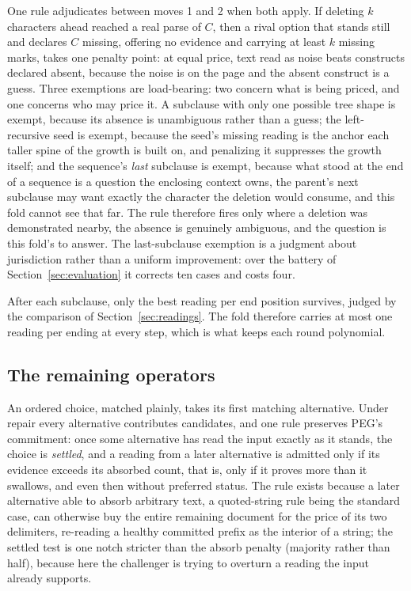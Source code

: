 \documentclass[manuscript]{acmart}
\begin{document}
One rule adjudicates between moves 1 and 2 when both apply. If deleting $k$ characters ahead reached a real parse of $C$, then a rival option that stands still and declares $C$ missing, offering no evidence and carrying at least $k$ missing marks, takes one penalty point: at equal price, text read as noise beats constructs declared absent, because the noise is on the page and the absent construct is a guess. Three exemptions are load-bearing: two concern what is being priced, and one concerns who may price it. A subclause with only one possible tree shape is exempt, because its absence is unambiguous rather than a guess; the left-recursive seed is exempt, because the seed's missing reading is the anchor each taller spine of the growth is built on, and penalizing it suppresses the growth itself; and the sequence's \emph{last} subclause is exempt, because what stood at the end of a sequence is a question the enclosing context owns, the parent's next subclause may want exactly the character the deletion would consume, and this fold cannot see that far. The rule therefore fires only where a deletion was demonstrated nearby, the absence is genuinely ambiguous, and the question is this fold's to answer. The last-subclause exemption is a judgment about jurisdiction rather than a uniform improvement: over the battery of Section~\ref{sec:evaluation} it corrects ten cases and costs four.

After each subclause, only the best reading per end position survives, judged by the comparison of Section~\ref{sec:readings}. The fold therefore carries at most one reading per ending at every step, which is what keeps each round polynomial.

\subsection{The remaining operators}
\label{sec:operators}

An ordered choice, matched plainly, takes its first matching alternative. Under repair every alternative contributes candidates, and one rule preserves PEG's commitment: once some alternative has read the input exactly as it stands, the choice is \emph{settled}, and a reading from a later alternative is admitted only if its evidence exceeds its absorbed count, that is, only if it proves more than it swallows, and even then without preferred status. The rule exists because a later alternative able to absorb arbitrary text, a quoted-string rule being the standard case, can otherwise buy the entire remaining document for the price of its two delimiters, re-reading a healthy committed prefix as the interior of a string; the settled test is one notch stricter than the absorb penalty (majority rather than half), because here the challenger is trying to overturn a reading the input already supports.
\end{document}
